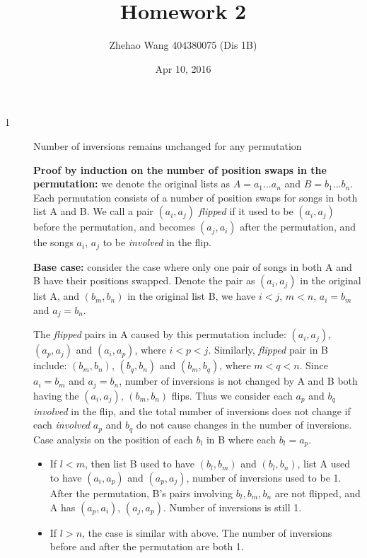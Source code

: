 \documentclass{article}
\title{Homework 2}
\author{Zhehao Wang 404380075 (Dis 1B)}
\date{Apr 10, 2016}
\begin{document}
\maketitle

\begin{description}

\item[1]{Number of inversions remains unchanged for any permutation}
  
  \textbf{Proof by induction on the number of position swaps in the permutation:} we denote the original lists as $A = {a_1...a_n}$ and $B = {b_1...b_n}$. Each permutation consists of a number of position swaps for songs in both list A and B. We call a pair $(a_i, a_j)$ \textit{flipped} if it used to be $(a_i, a_j)$ before the permutation, and becomes $(a_j, a_i)$ after the permutation, and the songs $a_i$, $a_j$ to be \textit{involved} in the flip.

  \textbf{Base case:} consider the case where only one pair of songs in both A and B have their positions swapped. Denote the pair as $(a_i, a_j)$ in the original list A, and $(b_m, b_n)$ in the original list B, we have $i < j$, $m < n$, $a_i = b_m$ and $a_j = b_n$. 

  The \textit{flipped} pairs in A caused by this permutation include: $(a_i, a_j)$, $(a_p, a_j)$ and $(a_i, a_p)$, where $i < p < j$. Similarly, \textit{flipped} pair in B include: $(b_m, b_n)$, $(b_q, b_n)$ and $(b_m, b_q)$, where $m < q < n$. Since $a_i = b_m$ and $a_j = b_n$, number of inversions is not changed by A and B both having the $(a_i, a_j)$, $(b_m, b_n)$ flips. Thus we consider each $a_p$ and $b_q$ \textit{involved} in the flip, and the total number of inversions does not change if each \textit{involved} $a_p$ and $b_q$ do not cause changes in the number of inversions. Case analysis on the position of each $b_l$ in B where each $b_l = a_p$.
  
  \begin{itemize}
  \item
  If $l < m$, then list B used to have $(b_l, b_m)$ and $(b_l, b_n)$, list A used to have $(a_i, a_p)$ and $(a_p, a_j)$, number of inversions used to be 1. After the permutation, B's pairs involving $b_l, b_m, b_n$ are not flipped, and A has $(a_p, a_i)$, $(a_j, a_p)$. Number of inversions is still 1.

  \item
  If $l > n$, the case is similar with above. The number of inversions before and after the permutation are both 1.


\end{itemize}
\end{description}
\end{document}

